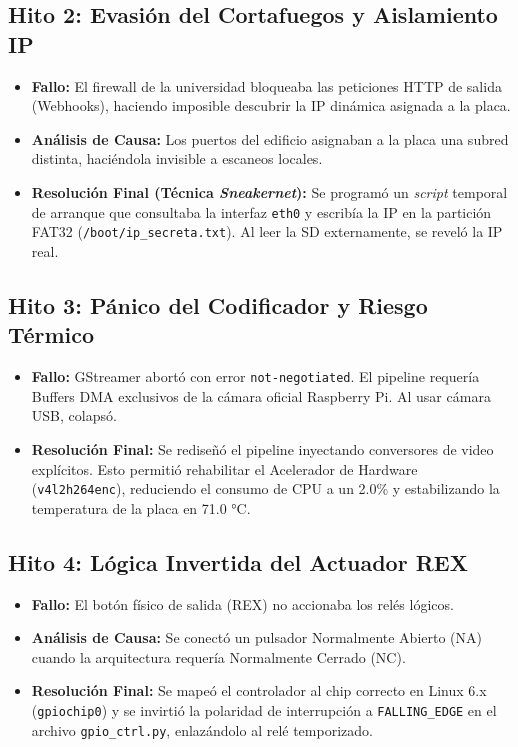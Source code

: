 \documentclass[11pt,a4paper]{article}
\begin{document}
\subsection{Hito 2: Evasión del Cortafuegos y Aislamiento IP}
\begin{itemize}
\item \textbf{Fallo:} El firewall de la universidad bloqueaba las peticiones HTTP de salida (Webhooks), haciendo imposible descubrir la IP dinámica asignada a la placa.
\item \textbf{Análisis de Causa:} Los puertos del edificio asignaban a la placa una subred distinta, haciéndola invisible a escaneos locales.
\item \textbf{Resolución Final (Técnica \textit{Sneakernet}):} Se programó un \textit{script} temporal de arranque que consultaba la interfaz \texttt{eth0} y escribía la IP en la partición FAT32 (\texttt{/boot/ip\_secreta.txt}). Al leer la SD externamente, se reveló la IP real.
\end{itemize}

\subsection{Hito 3: Pánico del Codificador y Riesgo Térmico}
\begin{itemize}
\item \textbf{Fallo:} GStreamer abortó con error \texttt{not-negotiated}. El pipeline requería Buffers DMA exclusivos de la cámara oficial Raspberry Pi. Al usar cámara USB, colapsó.
\item \textbf{Resolución Final:} Se rediseñó el pipeline inyectando conversores de video explícitos. Esto permitió rehabilitar el Acelerador de Hardware (\texttt{v4l2h264enc}), reduciendo el consumo de CPU a un 2.0\% y estabilizando la temperatura de la placa en 71.0 °C.
\end{itemize}

\subsection{Hito 4: Lógica Invertida del Actuador REX}
\begin{itemize}
\item \textbf{Fallo:} El botón físico de salida (REX) no accionaba los relés lógicos.
\item \textbf{Análisis de Causa:} Se conectó un pulsador Normalmente Abierto (NA) cuando la arquitectura requería Normalmente Cerrado (NC). 
\item \textbf{Resolución Final:} Se mapeó el controlador al chip correcto en Linux 6.x (\texttt{gpiochip0}) y se invirtió la polaridad de interrupción a \texttt{FALLING\_EDGE} en el archivo \texttt{gpio\_ctrl.py}, enlazándolo al relé temporizado.
\end{itemize}
\end{document}
